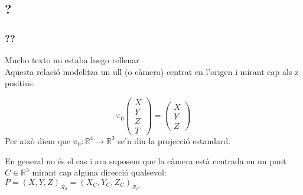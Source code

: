 \documentclass[../main.tex]{subfiles}
\begin{document}
	\subsection{?}
	\subsubsection{??}
	Mucho texto no estaba luego rellenar\\
	Aquesta relació modelitza un ull (o càmera) centrat en l'origen i mirant cap als z positius.\\
	\begin{obs}
		\begin{displaymath}
			\pi_0\begin{pmatrix}X\\Y\\Z\\T\end{pmatrix} = \begin{pmatrix}X\\Y\\Z\end{pmatrix}
		\end{displaymath}
		Per això diem que $\pi_0: \mathbb{R}^4 \to \mathbb{R}^3$ se'n diu la projecció estandard.
	\end{obs}
	En general no és el cas i ara suposem que la càmera està centrada en un punt $C \in \mathbb{R}^3$ mirant cap alguna direcció qualsevol:
	$P = (X,Y,Z)_{\mathcal{R}_0} = (X_C,Y_C,Z_C)_{\mathcal{R}_C}$
\end{document}
